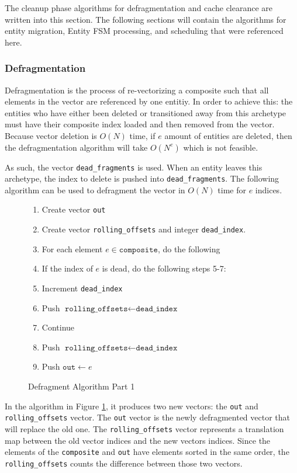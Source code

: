 The cleanup phase algorithms for defragmentation and cache clearance are written into this section. The following sections will contain the algorithms for entity migration, Entity FSM processing, and scheduling that were referenced here.

\subsubsection{Defragmentation}
Defragmentation is the process of re-vectorizing a composite such that all elements in the vector are referenced by one entitiy. In order to achieve this: the entities who have either been deleted or transitioned away from this archetype must have their composite index loaded and then removed from the vector. Because vector deletion is $O(N)$ time, if $e$ amount of entities are deleted, then the defragmentation algorithm will take $O(N^e)$ which is not feasible. 

As such, the vector \texttt{dead\_fragments} is used. When an entity leaves this archetype, the index to delete is pushed into \texttt{dead\_fragments}. The following algorithm can be used to defragment the vector in $O(N)$ time for $e$ indices.

\begin{figure}[htbp]
    \begin{enumerate}
        \item Create vector \texttt{out}
        \item Create vector \texttt{rolling\_offsets} and integer \texttt{dead\_index}.
        \item For each element $ e \in \texttt{composite}$, do the following
        \item If the index of $e$ is dead, do the following steps 5-7:
        \item Increment \texttt{dead\_index}
        \item Push $\texttt{rolling\_offsets} \leftarrow \texttt{dead\_index}$
        \item Continue
        \item Push $\texttt{rolling\_offsets} \leftarrow \texttt{dead\_index}$
        \item Push $\texttt{out} \leftarrow e$
    \end{enumerate}
    \caption{Defragment Algorithm Part 1}
    \label{alg:defrag1}
\end{figure}

In the algorithm in Figure \ref{alg:defrag1}, it produces two new vectors: the \texttt{out} and \texttt{rolling\_offsets} vector. The \texttt{out} vector is the newly defragmented vector that will replace the old one. The \texttt{rolling\_offsets} vector represents a translation map between the old vector indices and the new vectors indices. Since the elements of the \texttt{composite} and \texttt{out} have elements sorted in the same order, the \texttt{rolling\_offsets} counts the difference between those two vectors.
                  
